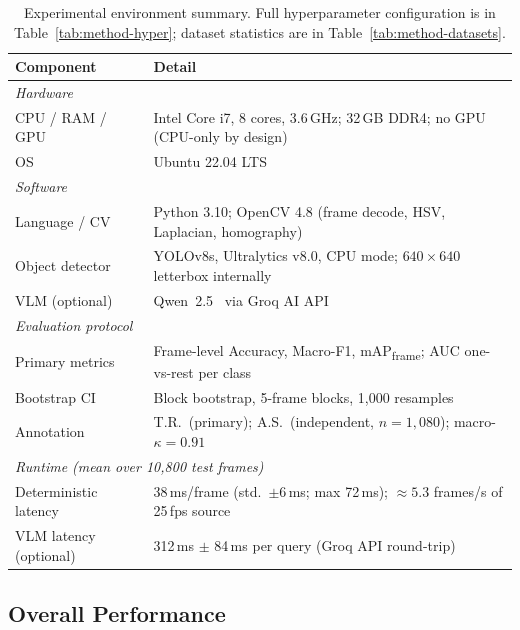 \documentclass[sensors,article,submit,pdftex,moreauthors]{Definitions/mdpi}
\begin{document}
\begin{table}[H]
\caption{Experimental environment summary. Full hyperparameter configuration is in Table~\ref{tab:method-hyper}; dataset statistics are in Table~\ref{tab:method-datasets}.}
\label{tab:expsetup}
\centering
\small
\setlength{\tabcolsep}{5pt}
\renewcommand{\arraystretch}{1.15}
\begin{tabular}{p{3.2cm} p{9.5cm}}
\toprule
\textbf{Component} & \textbf{Detail} \\
\midrule
\multicolumn{2}{l}{\textit{Hardware}} \\[1pt]
CPU / RAM / GPU & Intel Core i7, 8 cores, 3.6\,GHz; 32\,GB DDR4; no GPU (CPU-only by design) \\
OS              & Ubuntu 22.04 LTS \\[3pt]
\multicolumn{2}{l}{\textit{Software}} \\[1pt]
Language / CV   & Python 3.10; OpenCV 4.8 (frame decode, HSV, Laplacian, homography) \\
Object detector & YOLOv8s, Ultralytics v8.0, CPU mode; $640{\times}640$ letterbox internally \\
VLM (optional)  & Qwen~2.5~\cite{qwen25vl2025} via Groq AI API~\cite{groqapi2025} \\[3pt]
\multicolumn{2}{l}{\textit{Evaluation protocol}} \\[1pt]
Primary metrics & Frame-level Accuracy, Macro-F1, mAP\textsubscript{frame}; AUC one-vs-rest per class \\
Bootstrap CI    & Block bootstrap, 5-frame blocks, 1{,}000 resamples \\
Annotation      & T.R.\ (primary); A.S.\ (independent, $n{=}1{,}080$); macro-$\kappa{=}0.91$ \\[3pt]
\multicolumn{2}{l}{\textit{Runtime (mean over 10{,}800 test frames)}} \\[1pt]
Deterministic latency & 38\,ms/frame (std.\ $\pm$6\,ms; max 72\,ms); ${\approx}5.3$ frames/s of 25\,fps source \\
VLM latency (optional) & 312\,ms $\pm$ 84\,ms per query (Groq API round-trip) \\
\bottomrule
\end{tabular}
\end{table}
 
 
\subsection{Overall Performance}
\label{sec:overall}
 
\end{document}
